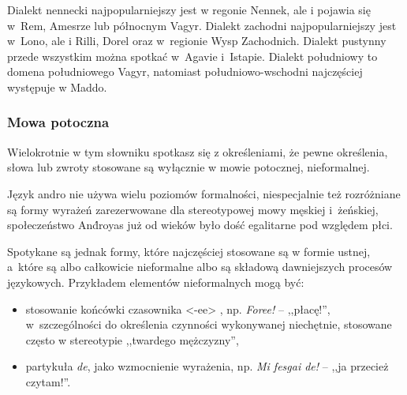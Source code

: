 \begin{spacing}{1.1}
Dialekt nennecki najpopularniejszy jest w regonie Nennek, ale i pojawia się
w~Rem, Amesrze lub północnym Vagyr. Dialekt zachodni najpopularniejszy jest
w~Lono, ale i Rilli, Dorel oraz w~regionie Wysp Zachodnich. Dialekt pustynny
przede wszystkim można spotkać w~Agavie i~Istapie. Dialekt południowy to domena
południowego Vagyr, natomiast południowo-wschodni najczęściej występuje w Maddo.

\subsubsection{Mowa potoczna}

Wielokrotnie w tym słowniku spotkasz się z określeniami, że pewne określenia,
słowa lub zwroty stosowane są wyłącznie w mowie potocznej, nieformalnej.

Język andro nie używa wielu poziomów formalności, niespecjalnie też rozróżniane
są formy wyrażeń zarezerwowane dla stereotypowej mowy męskiej i~żeńskiej,
społeczeństwo And́royas już od wieków było dość egalitarne pod względem płci.

Spotykane są jednak formy, które najczęściej stosowane są w formie ustnej,
a~które są albo całkowicie nieformalne albo są składową dawniejszych procesów
językowych. Przykładem elementów nieformalnych mogą być:

\begin{itemize}
	\item stosowanie końcówki czasownika <-ee> , np. \emph{Foree!}
	 -- ,,płacę!'', w~szczególności do określenia czynności
	wykonywanej niechętnie, stosowane często w stereotypie ,,twardego
	mężczyzny'',
	\item partykuła \emph{de}, jako wzmocnienie wyrażenia, np. \emph{Mi fesgai
	de!} -- ,,ja przecież czytam!''.
\end{itemize}

\end{spacing}
